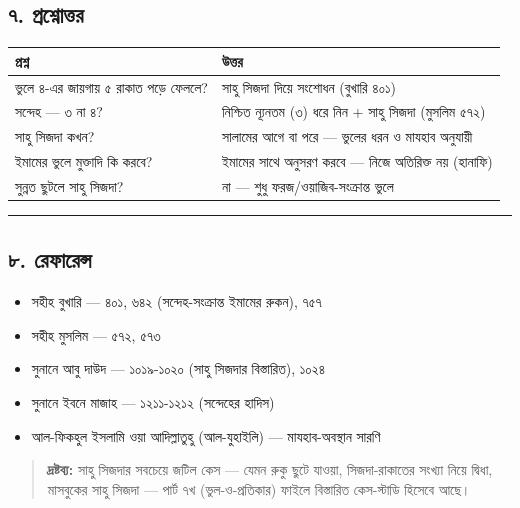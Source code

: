 \subsection*{৭. প্রশ্নোত্তর}

\begin{table}[h]\centering\small
\begin{tabular}{ll}
প্রশ্ন & উত্তর \\
\hline
ভুলে ৪-এর জায়গায় ৫ রাকাত পড়ে ফেললে? & সাহু সিজদা দিয়ে সংশোধন (বুখারি ৪০১) \\
সন্দেহ — ৩ না ৪? & নিশ্চিত ন্যূনতম (৩) ধরে নিন + সাহু সিজদা (মুসলিম ৫৭২) \\
সাহু সিজদা কখন? & সালামের আগে বা পরে — ভুলের ধরন ও মাযহাব অনুযায়ী \\
ইমামের ভুলে মুক্তাদি কি করবে? & ইমামের সাথে অনুসরণ করবে — নিজে অতিরিক্ত নয় (হানাফি) \\
সুন্নত ছুটলে সাহু সিজদা? & না — শুধু ফরজ/ওয়াজিব-সংক্রান্ত ভুলে \\
\hline
\end{tabular}
\end{table}

\medskip\hrule\medskip

\subsection*{৮. রেফারেন্স}

\begin{itemize}
\item সহীহ বুখারি — ৪০১, ৬৪২ (সন্দেহ-সংক্রান্ত ইমামের রুকন), ৭৫৭
\item সহীহ মুসলিম — ৫৭২, ৫৭৩
\item সুনানে আবু দাউদ — ১০১৯-১০২০ (সাহু সিজদার বিস্তারিত), ১০২৪
\item সুনানে ইবনে মাজাহ — ১২১১-১২১২ (সন্দেহের হাদিস)
\item আল-ফিকহুল ইসলামি ওয়া আদিল্লাতুহু (আল-যুহাইলি) — মাযহাব-অবস্থান সারণি
\end{itemize}
\begin{quote}
\textbf{দ্রষ্টব্য:} সাহু সিজদার সবচেয়ে জটিল কেস — যেমন রুকু ছুটে যাওয়া, সিজদা-রাকাতের সংখ্যা নিয়ে দ্বিধা, মাসবুকের সাহু সিজদা — পার্ট ৭খ (ভুল-ও-প্রতিকার) ফাইলে বিস্তারিত কেস-স্টাডি হিসেবে আছে।
\end{quote}


